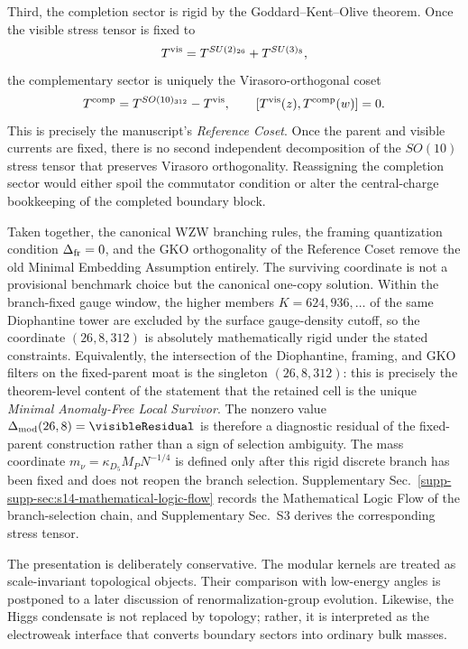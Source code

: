 \documentclass[11pt]{article}
\begin{document}
Third, the completion sector is rigid by the Goddard--Kent--Olive theorem. Once the visible stress tensor is fixed to
\begin{equation}
 T^{\rm vis}=T^{SU(2)_{26}}+T^{SU(3)_8},
\end{equation}
the complementary sector is uniquely the Virasoro-orthogonal coset
\begin{equation}
 T^{\rm comp}=T^{SO(10)_{312}}-T^{\rm vis},
 \qquad
 [T^{\rm vis}(z),T^{\rm comp}(w)]=0.
\end{equation}
This is precisely the manuscript's \emph{Reference Coset}. Once the parent and visible currents are fixed, there is no second independent decomposition of the $SO(10)$ stress tensor that preserves Virasoro orthogonality. Reassigning the completion sector would either spoil the commutator condition or alter the central-charge bookkeeping of the completed boundary block.

Taken together, the canonical WZW branching rules, the framing quantization condition $\Delta_{\rm fr}=0$, and the GKO orthogonality of the Reference Coset remove the old Minimal Embedding Assumption entirely. The surviving coordinate is not a provisional benchmark choice but the canonical one-copy solution. Within the branch-fixed gauge window, the higher members $K=624,936,\dots$ of the same Diophantine tower are excluded by the surface gauge-density cutoff, so the coordinate $(26,8,312)$ is absolutely mathematically rigid under the stated constraints. Equivalently, the intersection of the Diophantine, framing, and GKO filters on the fixed-parent moat is the singleton $(26,8,312)$: this is precisely the theorem-level content of the statement that the retained cell is the unique \emph{Minimal Anomaly-Free Local Survivor}. The nonzero value $\Delta_{\rm mod}(26,8)=\visibleResidual$ is therefore a diagnostic residual of the fixed-parent construction rather than a sign of selection ambiguity. The mass coordinate $m_\nu=\kappa_{D_5}M_PN^{-1/4}$ is defined only after this rigid discrete branch has been fixed and does not reopen the branch selection. Supplementary Sec.~\ref{supp-supp-sec:s14-mathematical-logic-flow} records the Mathematical Logic Flow of the branch-selection chain, and Supplementary Sec.~S3 derives the corresponding stress tensor.

The presentation is deliberately conservative. The modular kernels are treated as scale-invariant topological objects. Their comparison with low-energy angles is postponed to a later discussion of renormalization-group evolution. Likewise, the Higgs condensate is not replaced by topology; rather, it is interpreted as the electroweak interface that converts boundary sectors into ordinary bulk masses.
\end{document}
